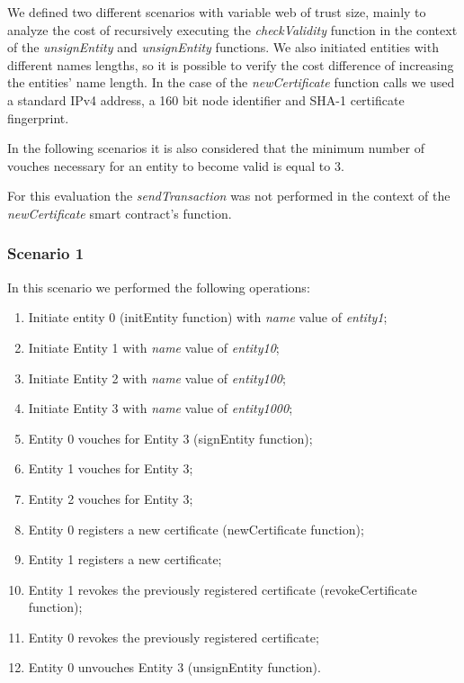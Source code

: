 We defined two different scenarios with variable web of trust size, mainly to analyze the cost of recursively executing the \textit{checkValidity} function in the context of the \textit{unsignEntity} and \textit{unsignEntity} functions.
We also initiated entities with different names lengths, so it is possible to verify the cost difference of increasing the entities' name length.
In the case of the \textit{newCertificate} function calls we used a standard IPv4 address, a 160 bit node identifier and SHA-1 certificate fingerprint.

In the following scenarios it is also considered that the minimum number of vouches necessary for an entity to become valid is equal to 3.

For this evaluation the \textit{sendTransaction} was not performed in the context of the \textit{newCertificate} smart contract's function.

\subsubsection{Scenario 1}

In this scenario we performed the following operations:

\begin{enumerate}[label=\alph*.]
  \item Initiate entity 0 (initEntity function) with \textit{name} value of \textit{entity1};
  \item Initiate Entity 1 with \textit{name} value of \textit{entity10};
  \item Initiate Entity 2 with \textit{name} value of \textit{entity100};
  \item Initiate Entity 3 with \textit{name} value of \textit{entity1000};
  \item Entity 0 vouches for Entity 3 (signEntity function);
  \item Entity 1 vouches for Entity 3;
  \item Entity 2 vouches for Entity 3;
  \item Entity 0 registers a new certificate (newCertificate function);
  \item Entity 1 registers a new certificate;
  \item Entity 1 revokes the previously registered certificate (revokeCertificate function);
  \item Entity 0 revokes the previously registered certificate;
  \item Entity 0 unvouches Entity 3 (unsignEntity function).
\end{enumerate}

